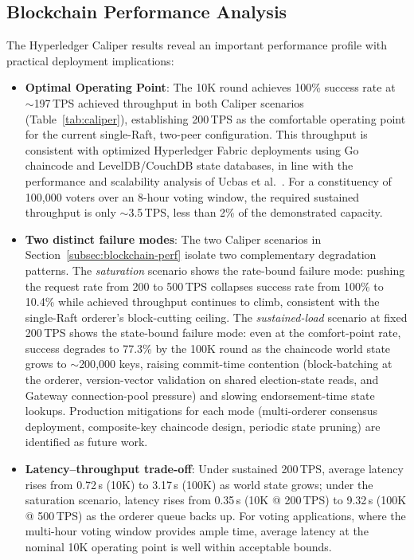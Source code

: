 \subsection{Blockchain Performance Analysis}
\label{subsec:blockchain-discussion}

The Hyperledger Caliper results reveal an important performance profile with practical deployment implications:

\begin{itemize}
    \item \textbf{Optimal Operating Point}: The 10K round achieves 100\% success rate at $\sim$197\,TPS achieved throughput in both Caliper scenarios (Table~\ref{tab:caliper}), establishing 200\,TPS as the comfortable operating point for the current single-Raft, two-peer configuration. This throughput is consistent with optimized Hyperledger Fabric deployments using Go chaincode and LevelDB/CouchDB state databases, in line with the performance and scalability analysis of Ucbas et al.~\cite{fabric_perf}. For a constituency of 100{,}000 voters over an 8-hour voting window, the required sustained throughput is only $\sim$3.5\,TPS, less than 2\% of the demonstrated capacity.

    \item \textbf{Two distinct failure modes}: The two Caliper scenarios in Section~\ref{subsec:blockchain-perf} isolate two complementary degradation patterns. The \emph{saturation} scenario shows the rate-bound failure mode: pushing the request rate from 200 to 500\,TPS collapses success rate from 100\% to 10.4\% while achieved throughput continues to climb, consistent with the single-Raft orderer's block-cutting ceiling. The \emph{sustained-load} scenario at fixed 200\,TPS shows the state-bound failure mode: even at the comfort-point rate, success degrades to 77.3\% by the 100K round as the chaincode world state grows to $\sim$200{,}000 keys, raising commit-time contention (block-batching at the orderer, version-vector validation on shared election-state reads, and Gateway connection-pool pressure) and slowing endorsement-time state lookups. Production mitigations for each mode (multi-orderer consensus deployment, composite-key chaincode design, periodic state pruning) are identified as future work.

    \item \textbf{Latency--throughput trade-off}: Under sustained 200\,TPS, average latency rises from 0.72\,s (10K) to 3.17\,s (100K) as world state grows; under the saturation scenario, latency rises from 0.35\,s (10K @ 200\,TPS) to 9.32\,s (100K @ 500\,TPS) as the orderer queue backs up. For voting applications, where the multi-hour voting window provides ample time, average latency at the nominal 10K operating point is well within acceptable bounds.
\end{itemize}

